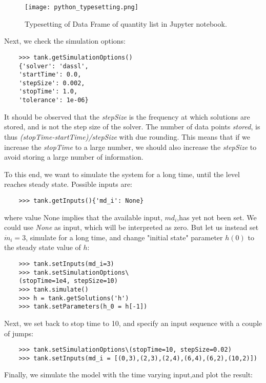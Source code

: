 \begin{figure}
	\texttt{[image: python\_typesetting.png]}
	\caption{Typesetting of Data Frame of quantity list in Jupyter notebook.}
	\label{fig:pythontypesetting}
\end{figure}

Next, we check the simulation options:

\begin{lstlisting}
	>>> tank.getSimulationOptions()
	{'solver': 'dassl',
	'startTime': 0.0,
	'stepSize': 0.002,
	'stopTime': 1.0,
	'tolerance': 1e-06}
\end{lstlisting}

It should be observed that the \textit{stepSize} is the frequency at which solutions are stored, and is not the step
size of the solver. The number of data points \textit{stored}, is thus \textit{(stopTime-startTime)/stepSize} with due
rounding. This means that if we increase the \textit{stopTime} to a large number, we should also increase the \textit{stepSize} to
avoid storing a large number of information.


To this end, we want to simulate the system for a long time, until the level reaches steady state. Possible inputs are:

\begin{lstlisting}
	>>> tank.getInputs(){'md_i': None}
\end{lstlisting}

where value None implies that the available input, $md_i$,has yet not been set. We could use \textit{None} as input, which will be interpreted as zero. 
But let us instead set $\dot{m}_i = 3$, simulate for a long time, and change "initial state"
parameter $h (0)$ to the steady state value of $h$:

\begin{lstlisting}
	>>> tank.setInputs(md_i=3)
	>>> tank.setSimulationOptions\
	(stopTime=1e4, stepSize=10)
	>>> tank.simulate()
	>>> h = tank.getSolutions('h')
	>>> tank.setParameters(h_0 = h[-1])
\end{lstlisting}

Next, we set back to stop time to 10, and specify an input sequence with a couple of jumps:

\begin{lstlisting}
	>>> tank.setSimulationOptions\(stopTime=10, stepSize=0.02)
	>>> tank.setInputs(md_i = [(0,3),(2,3),(2,4),(6,4),(6,2),(10,2)])
\end{lstlisting}

Finally, we simulate the model with the time varying input,and plot the result:

